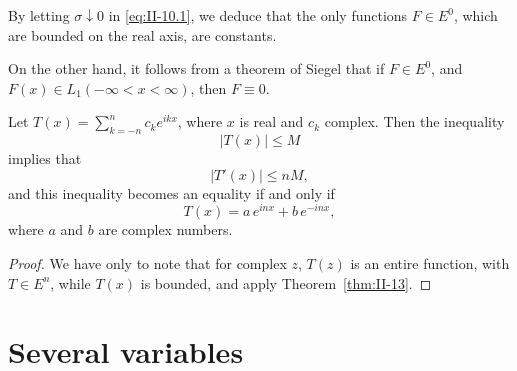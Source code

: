 \begin{remark}
By letting $\sigma\downarrow 0$ in \eqref{eq:II-10.1}, we deduce that the only functions $F\in E^{0}$, which are bounded on the real axis, are constants.

On the other hand, it follows from a theorem of Siegel that if $F\in E^{0}$, and $F(x)\in L_{1}(-\infty<x<\infty)$, then $F\equiv 0$.
\end{remark}

\begin{theorem}[S.\ Bernstein]\label{thm:II-14}
Let $T(x)=\sum_{k=-n}^{n}c_{k}e^{ikx}$, where $x$ is real and $c_{k}$ complex. Then the inequality
\[
|T(x)|\le M
\]
implies that
\[
|T'(x)|\le n M,
\]
and this inequality becomes an equality if and only if
\[
T(x)=a\,e^{inx}+b\,e^{-inx},
\]
where $a$ and $b$ are complex numbers.
\end{theorem}
\begin{proof}
We have only to note that for complex $z$, $T(z)$ is an entire function, with $T\in E^{n}$, while $T(x)$ is bounded, and apply Theorem~\ref{thm:II-13}.
\end{proof}

\setcounter{section}{10}
\section{Several variables}
\label{sec:II-11}


